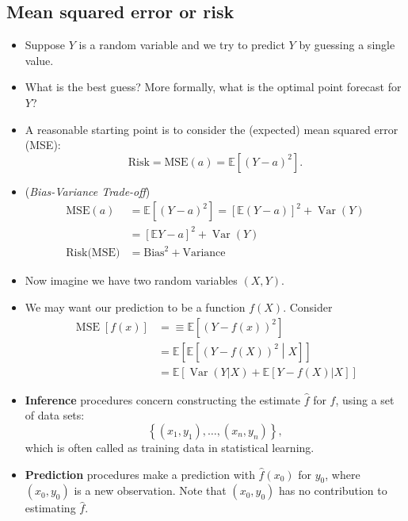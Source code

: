 \documentclass[11pt]{article}
\newcommand{\opn}{\operatorname}
\begin{document}
\subsection{Mean squared error or risk}
\begin{itemize}
  \item Suppose $Y$ is a random variable and we try to predict $Y$ by guessing a single value.
  \item What is the best guess? More formally, what is the optimal point forecast for $Y$?
  \item A reasonable starting point is to consider the (expected) mean squared error (MSE):
  $$
    \text{Risk} = \text{MSE}\left(a\right) = \mathbb{E}\left[ \left(Y-a\right)^{2}\right].
  $$
  \item (\emph{Bias-Variance Trade-off}) \begin{align*} \text{MSE}\left(a\right) &= \mathbb{E}\left[\left(Y-a\right)^{2} \right]= \left[\mathbb{E}\left(Y-a\right)\right]^{2} + \opn{Var}\left(Y\right)\\ &= \left[\mathbb{E}Y -a \right]^{2} + \opn{Var}\left(Y\right)\\ \text{Risk(MSE)} &= \text{Bias}^{2} + \text{Variance} \end{align*}
  \item Now imagine we have two random variables $\left(X,Y\right)$.
  \item We may want our prediction to be a function $f\left(X\right)$. Consider
  \begin{align*}
    \opn{MSE}\left[f\left(x\right)\right] &= \equiv \mathbb{E}\left[ \left(Y-f\left(x\right)\right)^{2}\right]\\
    &= \mathbb{E}\left[\mathbb{E}\left[\left(Y-f\left(X\right)\right)^{2}\middle|X\right]\right]\\
    &= \mathbb{E}\left[\opn{Var}\left(Y|X\right)+\mathbb{E}\left[Y-f\left(X\right)|X\right]\right]
  \end{align*}
  \item \textbf{Inference} procedures concern constructing the estimate $\hat{f}$ for $f$, using a set of data sets:
  $$
    \left\{\left(x_{1}, y_{1}\right), \ldots , \left(x_{n}, y_{n}\right) \right\},
  $$
  which is often called as training data in statistical learning.
  \item \textbf{Prediction} procedures make a prediction with $\hat{f}\left(x_{0}\right)$ for $y_{0}$, where $\left(x_{0}, y_{0}\right)$ is a new observation. Note that $\left(x_{0},y_{0}\right)$ has no contribution to estimating $\hat{f}$.

\end{itemize}
\end{document}
